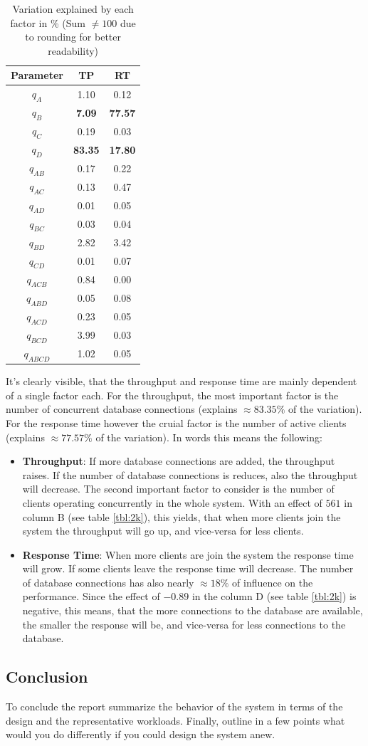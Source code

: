 \documentclass[11pt]{article}
\begin{document}
\begin{table}
\centering
\caption{Variation explained by each factor in \% (Sum $\neq100$ due to rounding for better readability)}
\label{tbl:2k_labels}
\begin{tabular}{ccc}
	Parameter & TP & RT \\ \hline
	$q_{A}$ & 1.10  & 0.12  \\
	$q_{B}$ & \textbf{7.09} & \textbf{77.57}  \\
	$q_{C}$ & 0.19 & 0.03  \\
	$q_{D}$ & \textbf{83.35} & \textbf{17.80} \\
	$q_{AB}$ & 0.17 & 0.22  \\
	$q_{AC}$ & 0.13  & 0.47  \\
	$q_{AD}$ & 0.01  & 0.05  \\
	$q_{BC}$ & 0.03  & 0.04  \\
	$q_{BD}$ & 2.82  & 3.42 \\
	$q_{CD}$ & 0.01  & 0.07  \\
	$q_{ACB}$ & 0.84  & 0.00  \\
	$q_{ABD}$ & 0.05  & 0.08  \\
	$q_{ACD}$ & 0.23  & 0.05  \\
	$q_{BCD}$ & 3.99  & 0.03  \\
	$q_{ABCD}$ & 1.02  & 0.05  \\
\end{tabular}
\end{table}
It's clearly visible, that the throughput and response time are mainly dependent of a single factor each. For the throughput, the most important factor is the number of concurrent database connections (explains $\approx83.35\%$ of the variation). For the response time however the cruial factor is the number of active clients (explains $\approx77.57\%$ of the variation). In words this means the following:
\begin{itemize}
	\item \textbf{Throughput}: If more database connections are added, the throughput raises. If the number of database connections is reduces, also the throughput will decrease. The second important factor to consider is the number of clients operating concurrently in the whole system. With an effect of $561$ in column B (see table \ref{tbl:2k}), this yields, that when more clients join the system the throughput will go up, and vice-versa for less clients.
	\item \textbf{Response Time}: When more clients are join the system the response time will grow. If some clients leave the response time will decrease. The number of database connections has also nearly $\approx18\%$ of influence on the performance. Since the effect of $-0.89$ in the column D (see table \ref{tbl:2k}) is negative, this means, that the more connections to the database are available, the smaller the response will be, and vice-versa for less connections to the database.
\end{itemize}
\subsection{Conclusion}\label{sec:conclusion}

To conclude the report summarize the behavior of the system in terms of
the design and the representative workloads. Finally, outline in a few
points what would you do differently if you could design the system
anew.
\end{document}

